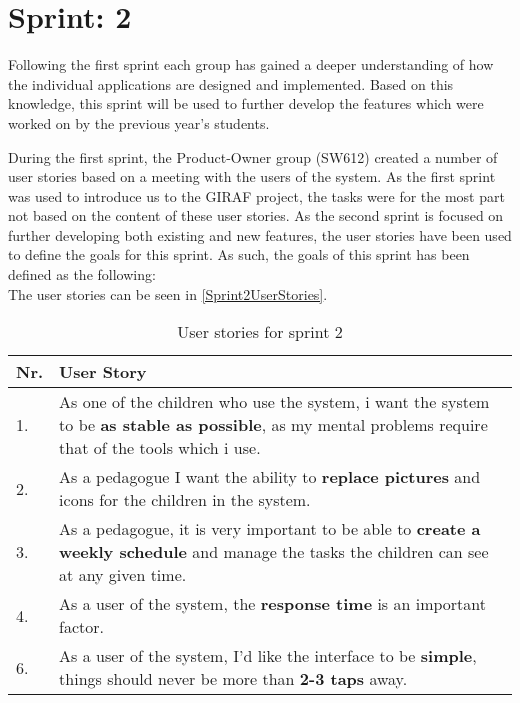 \chapter{Sprint: 2}
Following the first sprint each group has gained a deeper understanding of how
the individual applications are designed and implemented. Based on this
knowledge, this sprint will be used to further develop the features which were
worked on by the previous year's students.\nl

During the first sprint, the Product-Owner group (SW612) created a number of
user stories based on a meeting with the users of the system. As the first
sprint was used to introduce us to the GIRAF project, the tasks were for the
most part not based on the content of these user stories. As the second sprint
is focused on further developing both existing and new features, the user
stories have been used to define the goals for this sprint. As such, the goals
of this sprint has been defined as the following:\\
 The user stories can be seen in \autoref{Sprint2UserStories}.


\begin{table}[H]
\centering 
\begin{tabular}{|l|p{12.5cm}|}
\hline
Nr. & User Story \\\hline
1. & As one of the children who use the system, i want the system to be 
\textbf{as stable as possible}, as my mental problems require that of the tools
which i use. \\ \hline
2. & As a pedagogue I want the ability to \textbf{replace pictures} and icons
for the children in the system.\\ \hline
3. & As a pedagogue, it is very important to be able to \textbf{create a weekly
schedule} and manage the tasks the children can see at any given time.\\ \hline
4. & As a user of the system, the \textbf{response time} is an important
factor.\\ \hline
6. & As a user of the system, I'd like the interface to be \textbf{simple},
things should never be more than \textbf{2-3 taps} away. \\\hline
\end{tabular}
\caption{User stories for sprint 2}
\label{Sprint2UserStories}
\end{table}

